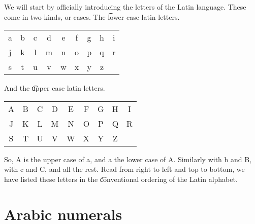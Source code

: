 We will start by officially introducing the letters of the Latin language.
These come in two kinds, or cases.
The \t{lower case latin letters}.
\begin{center}
\vspace{0.3cm}
\begin{tabular}{ccccccccc}
a & b & c & d & e & f & g & h & i\\
j & k & l & m & n & o & p & q & r\\
s & t & u & v & w & x & y & z & \\
\end{tabular}
\vspace{0.1cm}

%   
\end{center}
And the \t{upper case latin letters}.
\begin{center}
\vspace{0.3cm}
\begin{tabular}{ccccccccc}
A & B & C & D & E & F & G & H & I\\
J & K & L & M & N & O & P & Q & R\\
S & T & U & V & W & X & Y & Z & \\
\end{tabular}
\vspace{0.1cm}

\end{center}
So, A is the upper case of a, and a the lower case of A.
Similarly with b and B, with c and C, and all the rest.
Read from right to left and top to bottom, we have listed these letters in the \t{conventional ordering} of the Latin alphabet.

\section*{Arabic numerals}

